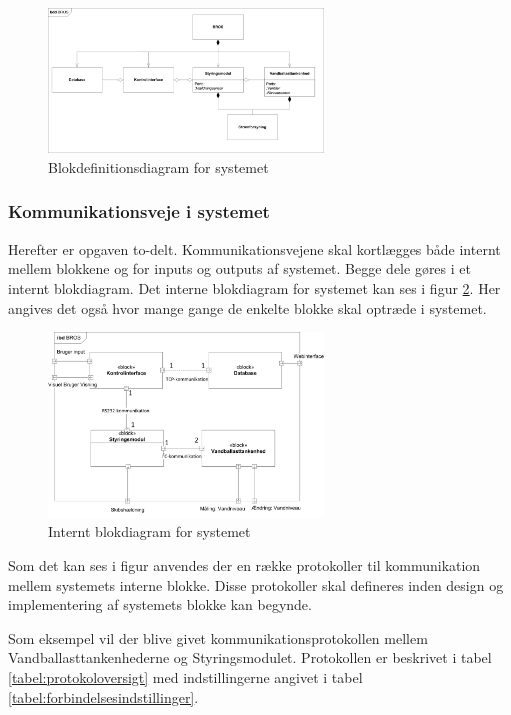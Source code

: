 \begin{figure}[htbp]
\centering
\includegraphics[width=0.65\textwidth]{billeder/Systemarkitektur/bdd_bros}
\caption{Blokdefinitionsdiagram for systemet}
\label{fig:bdd_bros}
\end{figure}

\subsubsection{Kommunikationsveje i systemet}
Herefter er opgaven to-delt. Kommunikationsvejene skal kortlægges både internt mellem blokkene og for inputs og outputs af systemet. Begge dele gøres i et internt blokdiagram. Det interne blokdiagram for systemet kan ses i figur \ref{fig:idb_bros}. Her angives det også hvor mange gange de enkelte blokke skal optræde i systemet.\\

\begin{figure}[H]
\centering
\includegraphics[width=0.65\textwidth]{billeder/Systemarkitektur/ibd_bros}
\caption{Internt blokdiagram for systemet}
\label{fig:idb_bros}
\end{figure}

Som det kan ses i figur anvendes der en række protokoller til kommunikation mellem systemets interne blokke. Disse protokoller skal defineres inden design og implementering af systemets blokke kan begynde.

Som eksempel vil der blive givet kommunikationsprotokollen mellem Vandballasttankenhederne og Styringsmodulet. Protokollen er beskrivet i tabel \ref{tabel:protokoloversigt} med indstillingerne angivet i tabel \ref{tabel:forbindelsesindstillinger}.


